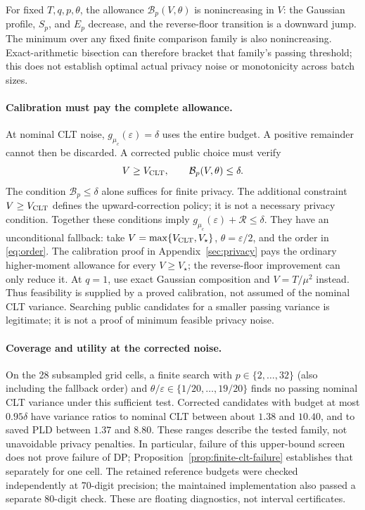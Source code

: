 \documentclass[11pt]{article}
\begin{document}
For fixed $T,q,p,\theta$, the allowance $\mathcal B_p(V,\theta)$ is
nonincreasing in $V$: the Gaussian profile, $S_p$, and $E_p$ decrease,
and the reverse-floor transition is a downward jump. The minimum over any
fixed finite comparison family is also nonincreasing. Exact-arithmetic
bisection can therefore bracket that family's passing threshold; this does
not establish optimal actual privacy noise or monotonicity across batch sizes.

\paragraph{Calibration must pay the complete allowance.}
At nominal CLT noise, $g_{\mu_c}(\varepsilon)=\delta$ uses the entire
budget. A positive remainder cannot then be discarded. A corrected
public choice must verify
\begin{equation}\label{eq:finite-corrected-selection}
 V\ge V_{\rm CLT},\qquad \mathcal B_p(V,\theta)\le\delta.
\end{equation}
The condition $\mathcal B_p\le\delta$ alone suffices for finite privacy.
The additional constraint $V\ge V_{\rm CLT}$ defines the upward-correction
policy; it is not a necessary privacy condition. Together these conditions
imply $g_{\mu_c}(\varepsilon)+\mathcal R\le\delta$.
They have an unconditional fallback: take
$V=\max\{V_{\rm CLT},V_\star\}$, $\theta=\varepsilon/2$, and the order
in \eqref{eq:order}. The calibration proof in
Appendix~\ref{sec:privacy} pays the ordinary higher-moment allowance for
every $V\ge V_\star$; the reverse-floor improvement can only reduce it.
At $q=1$, use exact Gaussian composition and $V=T/\mu^2$ instead.
Thus feasibility is supplied by a proved calibration, not assumed of the
nominal CLT variance. Searching public candidates for a smaller passing
variance is legitimate; it is not a proof of minimum feasible privacy noise.

\paragraph{Coverage and utility at the corrected noise.}
On the 28 subsampled grid cells, a finite search with
$p\in\{2,\ldots,32\}$ (also including the fallback order) and
$\theta/\varepsilon\in\{1/20,\ldots,19/20\}$ finds no passing nominal
CLT variance under this sufficient test. Corrected candidates with budget
at most $0.95\delta$ have variance ratios to nominal CLT between about
$1.38$ and $10.40$, and to saved PLD between $1.37$ and $8.80$.
These ranges describe the tested family, not unavoidable privacy penalties.
In particular, failure of this upper-bound screen does not prove failure
of DP; Proposition~\ref{prop:finite-clt-failure} establishes that separately
for one cell. The retained reference budgets were checked independently at 70-digit
precision; the maintained implementation also passed a separate 80-digit
check. These are floating diagnostics, not interval certificates.
\end{document}
